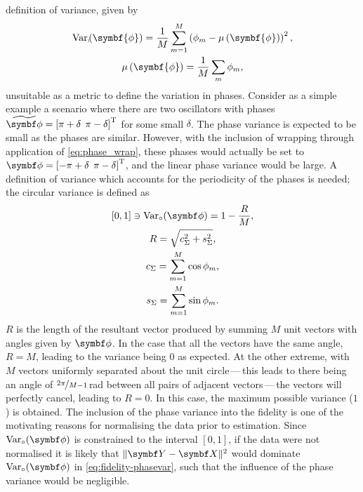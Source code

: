 definition of variance, given by
\begin{subequations}
    \begin{gather}
        \Var_{\shortmid}\hspace*{-3pt}\left(\symbf{\phi}\right) =
            \frac{1}{M} \sum_{m=1}^{M} \left(\phi_m - \mu\left(\symbf{\phi}\right)\right)^2, \\
        \mu\left(\symbf{\phi}\right) = \frac{1}{M} \sum_{m} \phi_m,
    \end{gather}
\end{subequations}
unsuitable as a metric to define the variation in phases. Consider as a simple
example a scenario
where there are two oscillators with phases $\widetilde{\bdphi} = \left[ \pi +
\delta\:\:\pi - \delta \right]\T$ for some small $\delta$.
The phase variance is expected to be small as the phases are similar.
However, with the inclusion of wrapping through application of
\cref{eq:phase_wrap}, these phases would actually be set to $\bdphi = \left[
    -\pi
+ \delta\:\:\pi - \delta \right]\T$, and the linear phase
variance would be large. A definition of variance which accounts for the
periodicity of the phases is needed; the circular variance is defined
as~\cite[Chapter 3]{Fisher1993}
\begin{subequations}
    \begin{gather}
        [0, 1] \ni \circvar = 1 - \frac{R}{M},\\
        R = \sqrt{c_{\Sigma}^2 + s_{\Sigma}^2}, \\
        c_{\Sigma} = \sum_{m=1}^M \cos \phi_m, \\
        s_{\Sigma} = \sum_{m=1}^M \sin \phi_m.
    \end{gather}
\end{subequations}
$R$ is the length of the resultant vector produced by summing $M$ unit vectors
with angles given by $\bdphi$. In the case that all the vectors have the
same angle, $R=M$, leading to the variance being $0$ as expected. At the other
extreme, with $M$ vectors uniformly separated about the unit circle\,---\,this leads to there being an angle of $\nicefrac{2 \pi}{M - 1}$\,\unit{\radian} between all
pairs of adjacent vectors\,---\,the
vectors will perfectly cancel, leading to $R=0$. In this case, the maximum
possible variance ($1$) is obtained.
The inclusion of the phase variance into the fidelity is one of the
motivating reasons for normalising the data prior to estimation. Since
$\circvar$ is constrained to the interval $[0, 1]$, if the data were not
normalised it is likely that $\lVert \bY - \bX \rVert^2$ would dominate
$\circvar$ in \cref{eq:fidelity-phasevar}, such that the influence of the phase
variance would be negligible.

